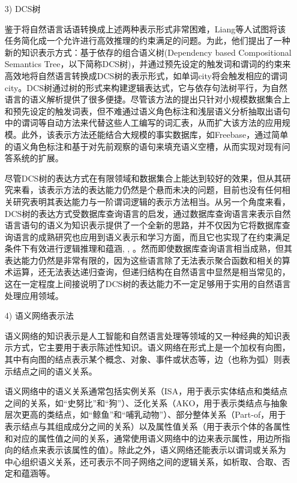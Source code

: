 \begin{enumerate}
\begin{enumerate}
\item[3)] DCS树\cite{Liang2013}

鉴于将自然语言话语转换成上述两种表示形式非常困难，Liang等人\cite{Liang2013}试图将该任务简化成一个允许进行高效推理的约束满足的问题。为此，他们提出了一种新的知识表示方式：基于依存的组合语义树(Dependency based  Compositional Semantics Tree，以下简称DCS树)，并通过预先设定的触发词和谓词的约束来高效地将自然语言转换成DCS树的表示形式，如单词city将会触发相应的谓词city。DCS树通过树的形式来构建逻辑表达式，它与依存句法树平行，为自然语言的语义解析提供了很多便捷。尽管该方法的提出只针对小规模数据集合上和预先设定的触发词表，但不难通过语义角色标注和浅层语义分析抽取出语句中的谓词等自动方法来代替这些人工编写的词汇表，从而扩大该方法的应用规模。此外，该表示方法还能结合大规模的事实数据库，如Freebase\cite{Bollacker2008}，通过简单的语义角色标注和基于对先前观察的语句来填充语义空槽，从而实现对现有问答系统的扩展。


尽管DCS树的表达方式在有限领域和数据集合上能达到较好的效果，但从其研究\cite{Liang2011}来看，该表示方法的表达能力仍然是个悬而未决的问题，目前也没有任何相关研究表明其表达能力与一阶谓词逻辑的表示方法相当。从另一个角度来看，DCS树的表达方式受数据库查询语言的启发\cite{Yarin2013}，通过数据库查询语言来表示自然语言语句的语义为知识表示提供了一个全新的思路，并不仅因为它将数据库查询语言的成熟研究也应用到语义表示和学习方面，而且它也实现了在约束满足条件下有效进行逻辑推理和蕴涵\cite{Giordani2010a}, \cite{Giordani2010b}, \cite{Giordani2009}。然而即使数据库查询语言相当成熟，但其表达能力仍然是非常有限的，因为这些语言除了无法表示聚合函数和相关的算术运算，还无法表达递归查询\cite{Libkin2003}，但递归结构在自然语言中显然是相当常见的，这在一定程度上间接说明了DCS树的表达能力不一定足够用于实用的自然语言处理应用领域。

\item[4)] 语义网络表示法

语义网络的知识表示是人工智能和自然语言处理等领域的又一种经典的知识表示方式，它主要用于表示陈述性知识。语义网络在形式上是一个加权有向图，其中有向图的结点表示某个概念、对象、事件或状态等，边（也称为弧）则表示结点之间的语义关系。

语义网络中的语义关系通常包括实例关系（ISA，用于表示实体结点和类结点之间的关系，如“史努比”和“狗”）、泛化关系（AKO，用于表示类结点与抽象层次更高的类结点，如“鲸鱼”和“哺乳动物”）、部分整体关系（Part-of，用于表示结点与其组成成分之间的关系）以及属性值关系（用于表示个体的各属性和对应的属性值之间的关系，通常使用语义网络中的边来表示属性，用边所指向的结点来表示该属性的值）。除此之外，语义网络还能表示以谓词或关系为中心组织语义关系，还可表示不同子网络之间的逻辑关系，如析取、合取、否定和蕴涵等。


\end{enumerate}
\end{enumerate}
